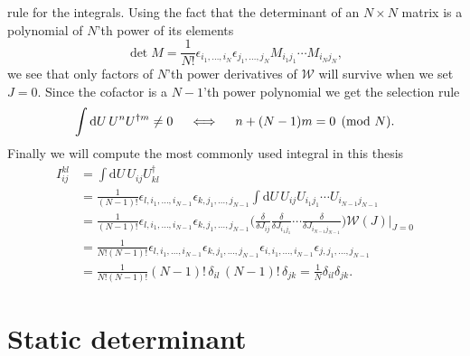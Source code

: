 rule for the integrals. Using the fact that the determinant of an $N \times N$ matrix is a
polynomial of $N$'th power of its elements
%
\begin{equation}
  \det M = \frac{1}{N!} \epsilon_{i_1,\dots,i_N} \epsilon_{j_1, \dots, j_N}
  M_{i_1j_1} \cdots M_{i_Nj_N},
\end{equation}
%
we see that only factors of $N$'th power derivatives of $\mathcal{W}$ will
survive when we set $J=0$. Since the cofactor is a $N-1$'th power polynomial we
get the selection rule
%
\begin{equation} \label{eq:integral-selection-rule}
  \int \mathrm{d} U \, U^n U^{\dagger m} \neq 0  \hskip1em\iff\hskip1em n + (N-1)m = 0 \pmod N.
\end{equation}
%
Finally we will compute the most commonly used integral in this thesis
%
\begin{align}
  I_{ij}^{kl} &= \int \mathrm{d} U \, U_{ij} U^{\dagger}_{kl} \nonumber\\
  &= \frac{1}{(N-1)!} \epsilon_{l,i_1,\dots,i_{N-1}} \epsilon_{k, j_1, \dots, j_{N-1}}
    \int \mathrm{d} U \, U_{ij} U_{i_1j_1} \cdots U_{i_{N-1}j_{N-1}} \nonumber\\
  &= \frac{1}{(N-1)!} \epsilon_{l,i_1,\dots,i_{N-1}} \epsilon_{k, j_1, \dots, j_{N-1}}
    \bigg( \frac{\delta}{\delta J_{ij}} \frac{\delta}{\delta J_{i_1j_1}} \cdots
    \frac{\delta}{\delta J_{i_{N-1}j_{N-1}}} \bigg) \mathcal{W}(J) \bigg|_{J=0}
    \nonumber \\
  &= \frac{1}{N!(N-1)!} \epsilon_{l,i_1,\dots,i_{N-1}} \epsilon_{k, j_1, \dots, j_{N-1}}
  \epsilon_{i,i_1,\dots,i_{N-1}} \epsilon_{j,j_1,\dots,j_{N-1}} \nonumber \\
  &= \frac{1}{N!(N-1)!} (N-1)!\,\delta_{il}\,(N-1)!\,\delta_{jk} = \frac{1}{N}
  \delta_{il} \delta_{jk} .
  \label{eq:uub-integral}
\end{align}

\section{Static determinant} \label{sec:evaluating-fermion-determinants}

